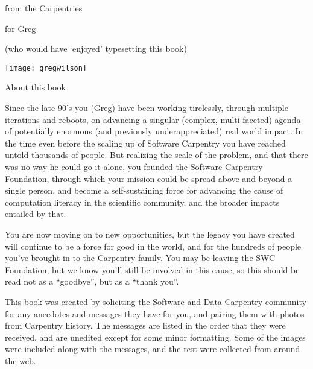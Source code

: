 %
%
% 
%
\newcommand{\signed}[1]{\par\hfill\normalfont--- \textit{#1}}

\newpage

\vspace*{1in}
\begin{center}
{\Large from the Carpentries} 

{\LARGE for Greg}

{\large (who would have `enjoyed' typesetting this book)}

\vspace*{0.5in}

\texttt{[image: gregwilson]}
\end{center}
\newpage

\vspace*{1in}
{\LARGE About this book}

Since the late 90's you (Greg) have been working tirelessly, through multiple
iterations and reboots, on advancing a singular (complex, multi-faceted) agenda
of potentially enormous (and previously underappreciated) real world impact.
In the time even before the scaling up of Software Carpentry you have reached
untold thousands of people.  But realizing the scale of the problem, and that
there was no way he could go it alone, you founded the Software Carpentry
Foundation, through which your mission could be spread above and beyond a
single person, and become a self-sustaining force for advancing the cause of
computation literacy in the scientific community, and the broader impacts
entailed by that.

You are now moving on to new opportunities, but the legacy you have created
will continue to be a force for good in the world, and for the hundreds of
people you've brought in to the Carpentry family.  You may be leaving the SWC
Foundation, but we know you'll still be involved in this cause, so this should
be read not as a ``goodbye'', but as a ``thank you''.

This book was created by soliciting the Software and Data Carpentry community
for any anecdotes and messages they have for you, and pairing them with photos
from Carpentry history.  The messages are listed in the order that they were
received, and are unedited except for some minor formatting.  Some of the
images were included along with the messages, and the rest were collected from
around the web.


